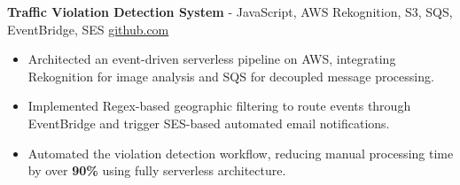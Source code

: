 \documentclass[11pt]{article}
\begin{document}
\textbf{Traffic Violation Detection System}{ - JavaScript, AWS Rekognition, S3, SQS, EventBridge, SES} \hfill \href{https://github.com/Monica20030707/AWS_rekonigition-N-read-database}{github.com} \\
\vspace{-9pt}
\begin{itemize}
  \item Architected an event-driven serverless pipeline on AWS, integrating Rekognition for image analysis and SQS for decoupled message processing.
  \item Implemented Regex-based geographic filtering to route events through EventBridge and trigger SES-based automated email notifications.
  \item Automated the violation detection workflow, reducing manual processing time by over \textbf{90\%} using fully serverless architecture.
\end{itemize}

\end{document}
